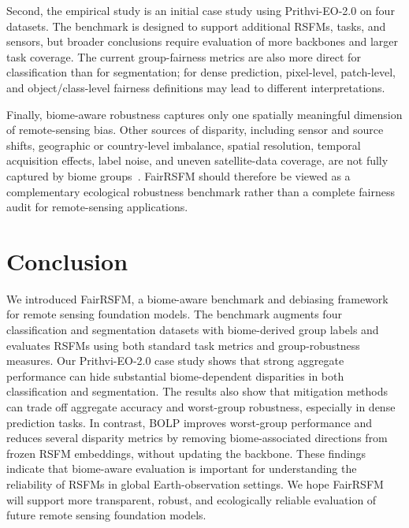 \documentclass[10pt,twocolumn,letterpaper]{article}
\newcommand{\method}{FairRSFM\xspace}
\begin{document}
Second, the empirical study is an initial case study using Prithvi-EO-2.0 on four datasets. The benchmark is designed to support additional RSFMs, tasks, and sensors, but broader conclusions require evaluation of more backbones and larger task coverage. The current group-fairness metrics are also more direct for classification than for segmentation; for dense prediction, pixel-level, patch-level, and object/class-level fairness definitions may lead to different interpretations.

Finally, biome-aware robustness captures only one spatially meaningful dimension of remote-sensing bias. Other sources of disparity, including sensor and source shifts, geographic or country-level imbalance, spatial resolution, temporal acquisition effects, label noise, and uneven satellite-data coverage, are not fully captured by biome groups~\cite{geobs2025,earthshift2026,coveragebias_satellite}. \method should therefore be viewed as a complementary ecological robustness benchmark rather than a complete fairness audit for remote-sensing applications.


\section{Conclusion}

We introduced \method, a biome-aware benchmark and debiasing framework for remote sensing foundation models. The benchmark augments four classification and segmentation datasets with biome-derived group labels and evaluates RSFMs using both standard task metrics and group-robustness measures. Our Prithvi-EO-2.0 case study shows that strong aggregate performance can hide substantial biome-dependent disparities in both classification and segmentation. The results also show that mitigation methods can trade off aggregate accuracy and worst-group robustness, especially in dense prediction tasks. In contrast, BOLP improves worst-group performance and reduces several disparity metrics by removing biome-associated directions from frozen RSFM embeddings, without updating the backbone. These findings indicate that biome-aware evaluation is important for understanding the reliability of RSFMs in global Earth-observation settings. We hope \method will support more transparent, robust, and ecologically reliable evaluation of future remote sensing foundation models.

\clearpage

{\small


}
\end{document}
